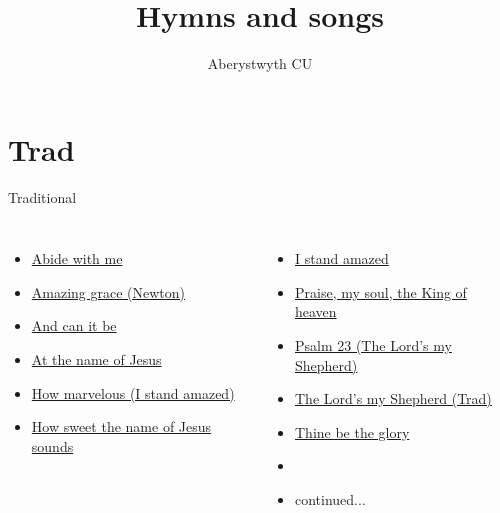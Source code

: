 \documentclass{beamer}
\title{Hymns and songs}
\author{Aberystwyth CU}
\date{}
\begin{document}
\maketitle
\section{Trad}

\begin{frame}{Traditional}
\begin{columns}
        \begin{itemize}
    \item \hyperlink{Abide with me[]}{Abide with me } \phantom{ 1 1 1 1 1 1 1 1 1 1 1}
    \item \hyperlink{Amazing grace[](Newton)}{Amazing grace (Newton)} \phantom{ 1 1 1 1 1 1 1}
    \item \hyperlink{And can it be[]}{And can it be } \phantom{ 1 1 1 1 1 1 1 1 1 1 1}
    \item \hyperlink{At the name of Jesus[]}{At the name of Jesus } \phantom{ 1 1 1 1 1 1 1}
    \item \hyperlink{I stand amazed['How marvelous']}{How marvelous (I stand amazed)} \phantom{ 1 1 1}
    \item \hyperlink{How sweet the name of Jesus sounds[]}{How sweet the name of Jesus sounds } \phantom{}
\end{itemize}
        \begin{itemize}
            \item \hyperlink{I stand amazed['How marvelous']}{I stand amazed } \phantom{ 1 1 1 1 1 1 1 1 1 1}
            \item \hyperlink{Praise, my soul, the King of heaven[]}{Praise, my soul, the King of heaven } \phantom{}
                            \item \hyperlink{The Lord's my Shepherd['Psalm 23'](Trad)}{Psalm 23 (The Lord's my Shepherd)} \phantom{ 1}
    \item \hyperlink{The Lord's my Shepherd['Psalm 23'](Trad)}{The Lord's my Shepherd (Trad)} \phantom{ 1 1 1}
    \item \hyperlink{Thine be the glory[]}{Thine be the glory } \phantom{ 1 1 1 1 1 1 1 1}
    \item[] \phantom{1}    \item[] continued...
            \end{itemize}
            \end{columns}
            \end{frame}
\end{document}
